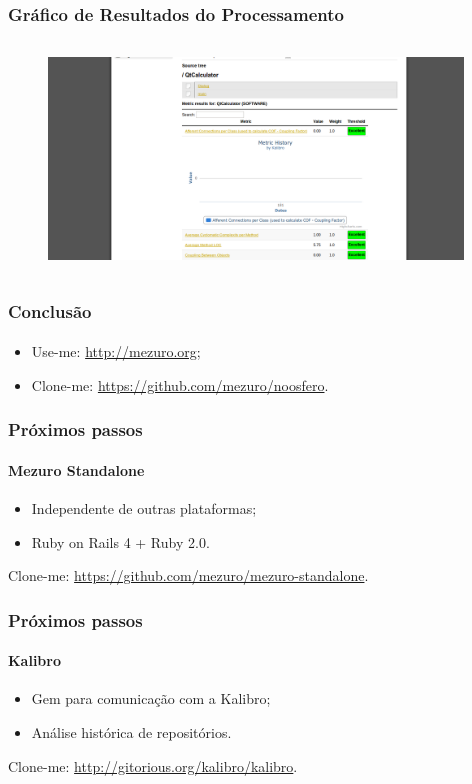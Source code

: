 \documentclass{beamer}
\begin{document}
    \begin{frame}
      \frametitle{Gráfico de Resultados do Processamento}
      \framesubtitle{}

      \begin{figure}
        \begin{center}
          \includegraphics[width=11cm, height=6cm]{images/10-processing-results-graphic.png}
          \label{fig:processing-results-graphic}
        \end{center}
      \end{figure}
    \end{frame}

  \begin{frame}
    \frametitle{Conclusão}
    \framesubtitle{}

    \begin{itemize}
      \item Use-me: \url{http://mezuro.org};
      \item Clone-me: \url{https://github.com/mezuro/noosfero}.
    \end{itemize}
  \end{frame}

  \begin{frame}
    \frametitle{Próximos passos}
    \framesubtitle{Mezuro Standalone}

    \begin{itemize}
      \item Independente de outras plataformas;
      \item Ruby on Rails 4 + Ruby 2.0.
    \end{itemize}

    Clone-me: \url{https://github.com/mezuro/mezuro-standalone}.
  \end{frame}

  \begin{frame}
    \frametitle{Próximos passos}
    \framesubtitle{Kalibro}

    \begin{itemize}
      \item Gem para comunicação com a Kalibro;
      \item Análise histórica de repositórios.
    \end{itemize}

    Clone-me: \url{http://gitorious.org/kalibro/kalibro}.
  \end{frame}
\end{document}
